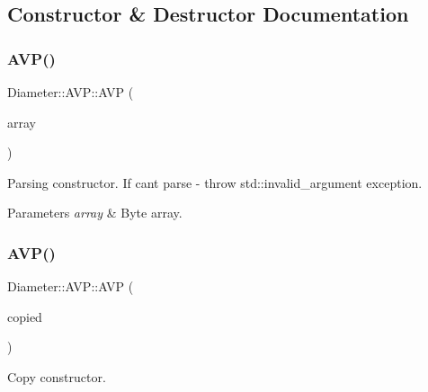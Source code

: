 \subsection{Constructor \& Destructor Documentation}
\mbox{\label{classDiameter_1_1AVP_a8ff7f26ccb7c31a2342d9e1895cb5f36}} 
\subsubsection{\texorpdfstring{A\+V\+P()}{AVP()}\hspace{0.1cm}{\footnotesize\ttfamily [1/2]}}
{\footnotesize\ttfamily Diameter\+::\+A\+V\+P\+::\+A\+VP (\begin{DoxyParamCaption}\item[{const Byte\+Array \&}]{array }\end{DoxyParamCaption})\hspace{0.3cm}{\ttfamily [explicit]}}



Parsing constructor. If can\textquotesingle{}t parse -\/ throw std\+::invalid\+\_\+argument exception. 


\begin{DoxyParams}{Parameters}
{\em array} & Byte array. \\
\hline
\end{DoxyParams}
\mbox{\label{classDiameter_1_1AVP_a7af17a8ef8718185e3aef42031f47e90}} 
\subsubsection{\texorpdfstring{A\+V\+P()}{AVP()}\hspace{0.1cm}{\footnotesize\ttfamily [2/2]}}
{\footnotesize\ttfamily Diameter\+::\+A\+V\+P\+::\+A\+VP (\begin{DoxyParamCaption}\item[{const \hyperlink{classDiameter_1_1AVP}{A\+VP} \&}]{copied }\end{DoxyParamCaption})\hspace{0.3cm}{\ttfamily [default]}}



Copy constructor. 


